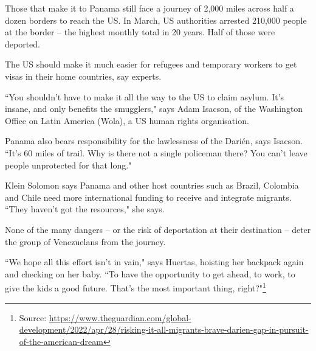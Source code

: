 \documentclass[10pt,a4paper]{article}
\newcommand{\qm}[1]{``#1"}
\newcommand{\source}[1]{\footnote{Source: \href{#1}{#1}}}
\begin{document}
Those that make it to Panama still face a journey of 2,000 miles across half a dozen borders to reach the US. In March, US authorities arrested 210,000 people at the border -- the highest monthly total in 20 years. Half of those were deported.

The US should make it much easier for refugees and temporary workers to get visas in their home countries, say experts.

\qm{You shouldn't have to make it all the way to the US to claim asylum. It's insane, and only benefits the smugglers,} says Adam Isacson, of the Washington Office on Latin America (Wola), a US human rights organisation.

Panama also bears responsibility for the lawlessness of the Darién, says Isacson. \qm{It's 60 miles of trail. Why is there not a single policeman there? You can't leave people unprotected for that long.}

Klein Solomon says Panama and other host countries such as Brazil, Colombia and Chile need more international funding to receive and integrate migrants. \qm{They haven't got the resources,} she says.

None of the many dangers -- or the risk of deportation at their destination -- deter the group of Venezuelans from the journey.

\qm{We hope all this effort isn't in vain,} says Huertas, hoisting her backpack again and checking on her baby. \qm{To have the opportunity to get ahead, to work, to give the kids a good future. That's the most important thing, right?}\source{https://www.theguardian.com/global-development/2022/apr/28/risking-it-all-migrants-brave-darien-gap-in-pursuit-of-the-american-dream}
\end{document}
